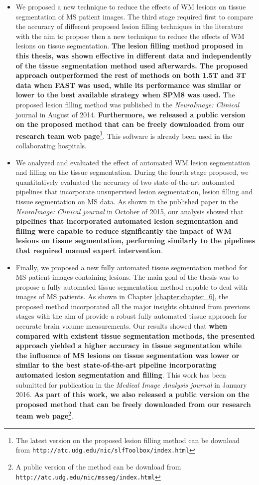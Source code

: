 \begin{itemize}
\item We proposed a new technique to reduce the effects of WM lesions on tissue segmentation of MS patient images. The third stage required first to compare the accuracy of different proposed lesion filling techniques in the literature with the aim to propose then a new technique to reduce the effects of WM lesions on tissue segmentation. \textbf{The lesion filling method proposed in this thesis, was shown effective in different data and independently of the tissue segmentation method used afterwards. The proposed approach outperformed the rest of methods on both 1.5T and 3T data when FAST was used, while its performance was similar or lower to the best available strategy when SPM8 was used.} The proposed lesion filling method was  published in the\textit{ NeuroImage: Clinical} journal in August of 2014. \textbf{Furthermore, we released a public version on the proposed method that can be freely downloaded from our research team web page}\footnote{The latest version on the proposed lesion filling method can be download from \texttt{http://atc.udg.edu/nic/slfToolbox/index.html}}. This software is already been used in the collaborating hospitals.  

\item We analyzed and evaluated the effect of automated WM lesion segmentation and filling on the tissue segmentation. During the fourth stage proposed, we quantitatively evaluated the accuracy of two state-of-the-art automated pipelines that incorporate unsupervised lesion segmentation, lesion filling and tissue segmentation on MS data.  As shown in the published paper in the \textit{NeuroImage: Clinical journal} in October of 2015, our analysis showed that \textbf{pipelines that incorporated automated lesion segmentation and filling were capable to reduce significantly the impact of WM lesions on tissue segmentation, performing similarly to the pipelines that required manual expert intervention}.

\item Finally, we proposed a new fully automated tissue segmentation method for MS patient images containing lesions. The main goal of the thesis was to propose a fully automated tissue segmentation method capable to deal with images of MS patients. As shown in Chapter \ref{chapter:chapter_6}, the proposed method incorporated all the major insights obtained from previous stages with the aim of provide a robust fully automated tissue approach for accurate brain volume measurements. Our results showed that  \textbf{when compared with existent tissue segmentation methods, the presented approach yielded a higher accuracy in tissue segmentation while the influence of MS lesions on tissue segmentation was lower or similar to the best state-of-the-art pipeline incorporating automated lesion segmentation and filling}. This work has been submitted for publication in the\textit{ Medical Image Analysis journal }in January 2016. \textbf{As part of this work, we also released a public version on the proposed method that can be freely downloaded from our research team web page}\footnote{A public version of the method can be download from \texttt{http://atc.udg.edu/nic/msseg/index.html}}.


\end{itemize}
